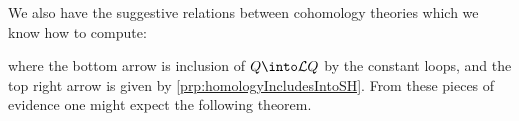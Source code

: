     We also have the suggestive relations between cohomology theories which we know how to compute:
    
    where the bottom arrow is inclusion of $Q\into \mathcal LQ$ by the constant loops, and the top right arrow is given by \cref{prp:homologyIncludesIntoSH}. From these pieces of evidence one might expect the following theorem. 

    

    

